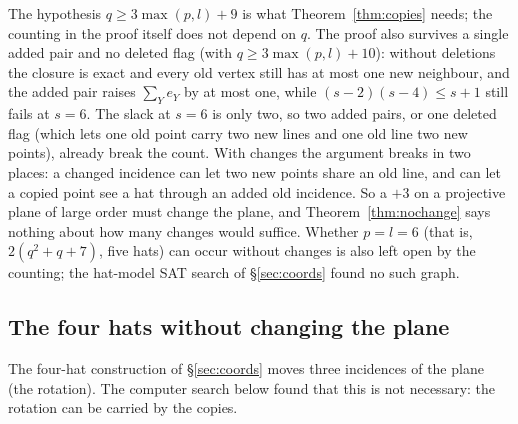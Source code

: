 The hypothesis $q \ge 3\max(p,l)+9$ is what Theorem~\ref{thm:copies} needs; the counting in the proof itself does not
depend on $q$. The proof also survives a single added pair and no deleted flag (with $q \ge 3\max(p,l)+10$): without
deletions the closure is exact and every old vertex still has at most one new neighbour, and the added pair raises
$\sum_Y e_Y$ by at most one, while $(s-2)(s-4) \le s+1$ still fails at $s = 6$. The slack at $s = 6$ is only two, so two
added pairs, or one deleted flag (which lets one old point carry two new lines and one old line two new points), already
break the count. With changes the argument breaks in two places: a changed incidence can let two new points share an
old line, and can let a copied point see a hat through an added old incidence. So a $+3$ on a projective plane of large
order must change the plane, and Theorem~\ref{thm:nochange} says nothing about how many changes would suffice.
Whether $p = l = 6$ (that is, $2(q^2+q+7)$, five hats) can occur without changes is also left open by the counting;
the hat-model SAT search of \S\ref{sec:coords} found no such graph.

\subsection{The four hats without changing the plane}\label{ssec:zero}
The four-hat construction of \S\ref{sec:coords} moves three incidences of the plane (the rotation). The computer
search below found that this is not necessary: the rotation can be carried by the copies.

